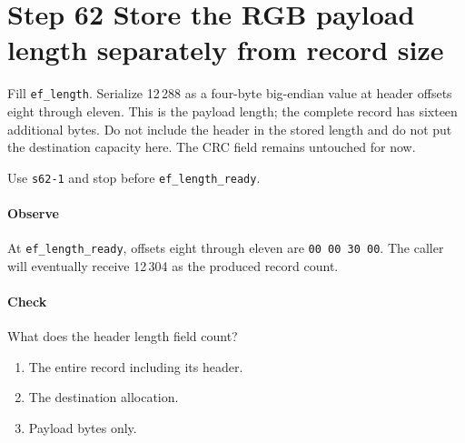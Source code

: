 \section{Step 62 Store the RGB payload length separately from record size}
Fill \texttt{ef\_length}. Serialize 12\,288 as a four-byte big-endian value at header offsets eight through eleven. This is the payload length; the complete record has sixteen additional bytes. Do not include the header in the stored length and do not put the destination capacity here. The CRC field remains untouched for now.

Use \texttt{s62-1} and stop before \texttt{ef\_length\_ready}.

\paragraph{Observe} At \texttt{ef\_length\_ready}, offsets eight through eleven are \texttt{00 00 30 00}. The caller will eventually receive 12\,304 as the produced record count.

\paragraph{Check} What does the header length field count?
\begin{enumerate}[label=\Alph*.]
  \item The entire record including its header.
  \item The destination allocation.
  \item Payload bytes only.
\end{enumerate}
